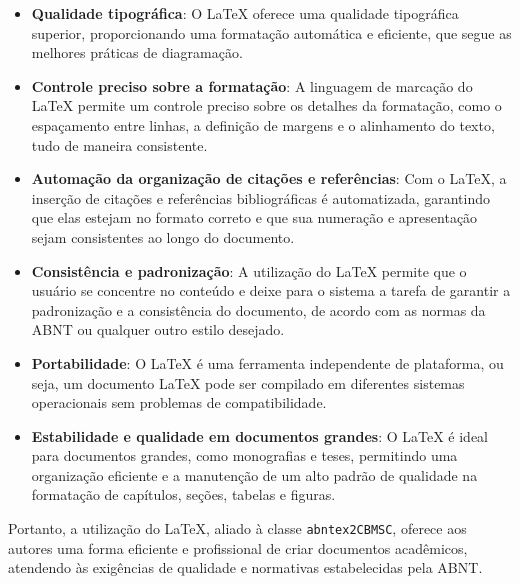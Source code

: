 \begin{itemize}
    \item \textbf{Qualidade tipográfica}: O LaTeX oferece uma qualidade tipográfica superior, proporcionando uma formatação automática e eficiente, que segue as melhores práticas de diagramação.
    
    \item \textbf{Controle preciso sobre a formatação}: A linguagem de marcação do LaTeX permite um controle preciso sobre os detalhes da formatação, como o espaçamento entre linhas, a definição de margens e o alinhamento do texto, tudo de maneira consistente.
    
    \item \textbf{Automação da organização de citações e referências}: Com o LaTeX, a inserção de citações e referências bibliográficas é automatizada, garantindo que elas estejam no formato correto e que sua numeração e apresentação sejam consistentes ao longo do documento.
    
    \item \textbf{Consistência e padronização}: A utilização do LaTeX permite que o usuário se concentre no conteúdo e deixe para o sistema a tarefa de garantir a padronização e a consistência do documento, de acordo com as normas da ABNT ou qualquer outro estilo desejado.
    
    \item \textbf{Portabilidade}: O LaTeX é uma ferramenta independente de plataforma, ou seja, um documento LaTeX pode ser compilado em diferentes sistemas operacionais sem problemas de compatibilidade.
    
    \item \textbf{Estabilidade e qualidade em documentos grandes}: O LaTeX é ideal para documentos grandes, como monografias e teses, permitindo uma organização eficiente e a manutenção de um alto padrão de qualidade na formatação de capítulos, seções, tabelas e figuras.
\end{itemize}

Portanto, a utilização do LaTeX, aliado à classe \texttt{abntex2CBMSC}, oferece aos autores uma forma eficiente e profissional de criar documentos acadêmicos, atendendo às exigências de qualidade e normativas estabelecidas pela \acrshort{ABNT}.
